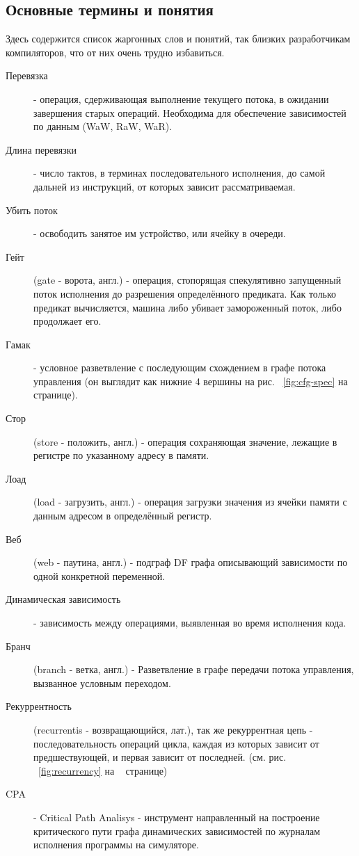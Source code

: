 \documentclass[a4paper,12pt,titlepage]{article}
\newcommand*{\fig}[1]{рис. ~{\ref{fig:#1}}}
\begin{document}
\subsection{Основные термины и понятия}
Здесь содержится список жаргонных слов и понятий, так близких разработчикам компиляторов, что от них очень трудно избавиться.
\begin{description}
	\item[Перевязка] - операция, сдерживающая выполнение текущего потока, в ожидании завершения старых операций. Необходима для обеспечение зависимостей по данным (WaW, RaW, WaR).
	\item[Длина перевязки] - число тактов, в терминах последовательного исполнения, до самой дальней из инструкций, от которых зависит рассматриваемая.
	\item[Убить поток] - освободить занятое им устройство, или ячейку в очереди.
	\item[Гейт] (gate - ворота, англ.) - операция, стопорящая спекулятивно запущенный поток исполнения до разрешения определённого предиката. Как только предикат вычисляется, машина либо убивает замороженный поток, либо продолжает его.
	\item[Гамак] - условное разветвление с последующим схождением в графе потока управления (он выглядит как нижние 4 вершины на \fig{cfg-spec} на ~\pageref{fig:cfg-spec} странице).
	\item[Стор] (store - положить, англ.) - операция сохраняющая значение, лежащие в регистре по указанному адресу в памяти.
	\item[Лоад] (load - загрузить, англ.) - операция загрузки значения из ячейки памяти с данным адресом в определённый регистр.
	\item[Веб] (web - паутина, англ.) - подграф DF графа описывающий зависимости по одной конкретной переменной.
	\item[Динамическая зависимость] - зависимость между операциями, выявленная во время исполнения кода.
	\item[Бранч] (branch - ветка, англ.) - Разветвление в графе передачи потока управления, вызванное условным переходом.
	\item[Рекуррентность] (recurrentis - возвращающийся, лат.), так же рекуррентная цепь - последовательность операций цикла, каждая из которых зависит от предшествующей, и первая зависит от последней. (см. \fig{recurrency} на ~\pageref{fig:recurrency} странице)
	\item[CPA] - Critical Path Analisys - инструмент направленный на построение критического пути графа динамических зависимостей по журналам исполнения программы на симуляторе.
\end{description}
\end{document}
